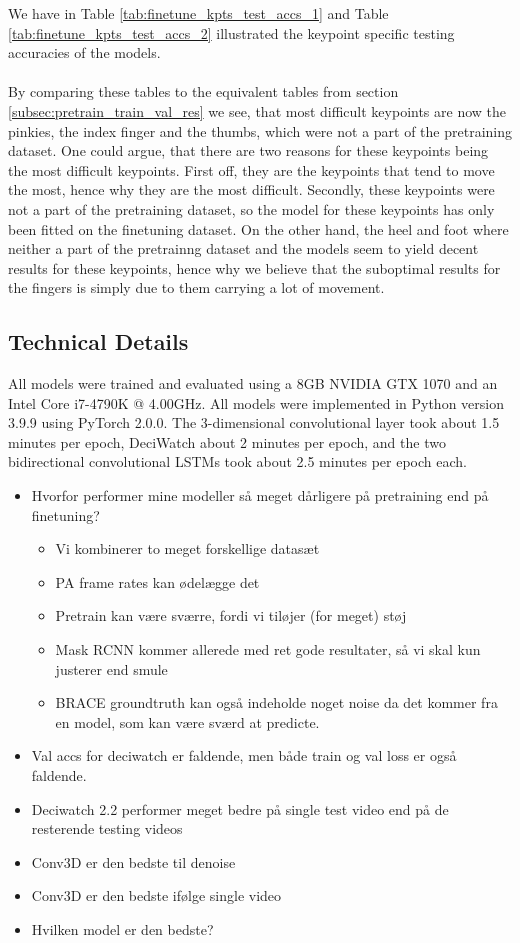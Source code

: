 \documentclass[./main.tex]{subfiles}
\begin{document}
\noindent We have in Table \ref{tab:finetune_kpts_test_accs_1} and Table \ref{tab:finetune_kpts_test_accs_2} illustrated the keypoint specific testing accuracies of the models. 
\\
\\
By comparing these tables to the equivalent tables from section \ref{subsec:pretrain_train_val_res} we see, that most difficult keypoints are now the pinkies, the index finger and the thumbs, which were not a part of the pretraining dataset. One could argue, that there are two reasons for these keypoints being the most difficult keypoints. First off, they are the keypoints that tend to move the most, hence why they are the most difficult. Secondly, these keypoints were not a part of the pretraining dataset, so the model for these keypoints has only been fitted on the finetuning dataset. On the other hand, the heel and foot where neither a part of the pretrainng dataset and the models seem to yield decent results for these keypoints, hence why we believe that the suboptimal results for the fingers is simply due to them carrying a lot of movement.

\subsection{Technical Details}
All models were trained and evaluated using a 8GB NVIDIA GTX 1070 and an Intel Core i7-4790K @ 4.00GHz. All models were implemented in Python version 3.9.9 using PyTorch 2.0.0. The 3-dimensional convolutional layer took about 1.5 minutes per epoch, DeciWatch about 2 minutes per epoch, and the two bidirectional convolutional LSTMs took about 2.5 minutes per epoch each.

\begin{itemize}
    \item Hvorfor performer mine modeller så meget dårligere på pretraining end på finetuning?
    \begin{itemize}
        \item Vi kombinerer to meget forskellige datasæt
        \item PA frame rates kan ødelægge det
        \item Pretrain kan være sværre, fordi vi tiløjer (for meget) støj
        \item Mask RCNN kommer allerede med ret gode resultater, så vi skal kun justerer end smule
        \item BRACE groundtruth kan også indeholde noget noise da det kommer fra en model, som kan være sværd at predicte.
    \end{itemize}
    \item Val accs for deciwatch er faldende, men både train og val loss er også faldende.
    \item Deciwatch 2.2 performer meget bedre på single test video end på de resterende testing videos
    \item Conv3D er den bedste til denoise
    \item Conv3D er den bedste ifølge single video 
    \item Hvilken model er den bedste?
\end{itemize}
\end{document}
